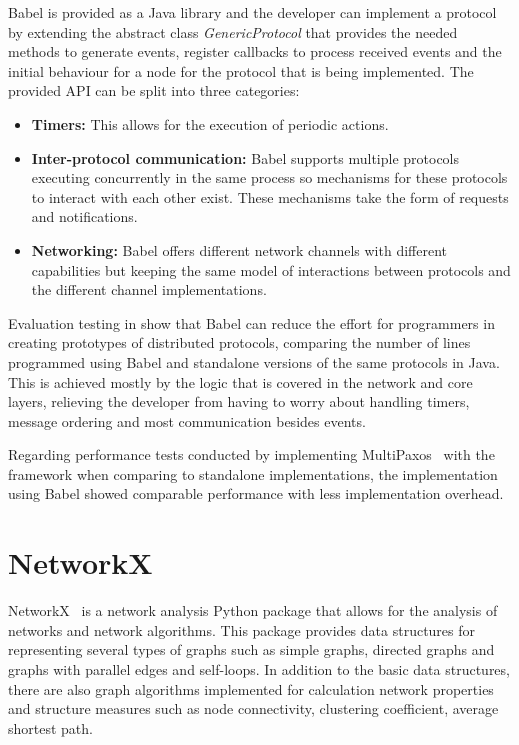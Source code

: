 Babel is provided as a Java library and the developer can implement a protocol
by extending the abstract class \textit{GenericProtocol} that provides the needed
methods to generate events, register callbacks to process received events and 
the initial behaviour for a node for the protocol that is being implemented.
The provided API can be split into three categories:

\begin{itemize}
  \item \textbf{Timers:} This allows for the execution of periodic actions.
  \item \textbf{Inter-protocol communication:} Babel supports multiple protocols
executing concurrently in the same process so mechanisms for these protocols
to interact with each other exist. These mechanisms take the form of requests and
notifications.
  \item \textbf{Networking:} Babel offers different network channels with different
capabilities but keeping the same model of interactions between protocols and the
different channel implementations.
\end{itemize}

Evaluation testing in \cite{babel} show that Babel can reduce the effort for programmers
in creating prototypes of distributed protocols, comparing the number of lines programmed
using Babel and standalone versions of the same protocols in Java. This is achieved
mostly by the logic that is covered in the network and core layers, relieving the developer
from having to worry about handling timers, message ordering and most communication besides events.

Regarding performance tests conducted by implementing MultiPaxos~\cite{paxos} with the framework
when comparing to standalone implementations, the implementation using Babel showed comparable performance
with less implementation overhead.

\section{NetworkX}\label{sec:networkx}

NetworkX~\cite{networkx} is a network analysis Python package that allows for the analysis of
networks and network algorithms. This package provides data structures for representing
several types of graphs such as simple graphs, directed graphs and graphs with parallel
edges and self-loops. In addition to the basic data structures, there are also
graph algorithms implemented for calculation network properties and structure measures
such as node connectivity, clustering coefficient, average shortest path.

